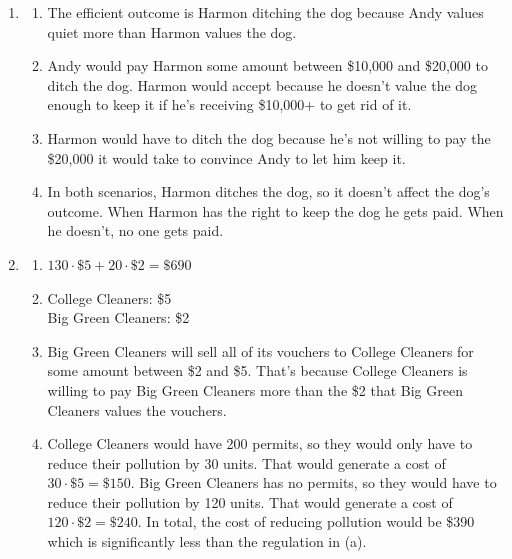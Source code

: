\documentclass{article}
\begin{document}
\begin{enumerate}
\begin{enumerate}
	\item The government could place a \$2 per unit subsidy on solar cells.
	
	\end{enumerate}
	
\item

	\begin{enumerate}
	
	\item The efficient outcome is Harmon ditching the dog because Andy values quiet more than Harmon values the dog.
	
	\item Andy would pay Harmon some amount between \$10,000 and \$20,000 to ditch the dog. Harmon would accept because he doesn't value the dog enough to keep it if he's receiving \$10,000+ to get rid of it. 
	
	\item Harmon would have to ditch the dog because he's not willing to pay the \$20,000 it would take to convince Andy to let him keep it.
	
	\item In both scenarios, Harmon ditches the dog, so it doesn't affect the dog's outcome. When Harmon has the right to keep the dog he gets paid. When he doesn't, no one gets paid.
	
	\end{enumerate}
	
\item

	\begin{enumerate}
	
	\item $130 \cdot \$5 + 20 \cdot \$2 = \$690$
	
	\item College Cleaners: \$5 \\
		Big Green Cleaners: \$2
		
	\item Big Green Cleaners will sell all of its vouchers to College Cleaners for some amount between \$2 and \$5. That's because College Cleaners is willing to pay Big Green Cleaners more than the \$2 that Big Green Cleaners values the vouchers.
	
	\item College Cleaners would have 200 permits, so they would only have to reduce their pollution by 30 units. That would generate a cost of $30 \cdot \$5 = \$150$. Big Green Cleaners has no permits, so they would have to reduce their pollution by 120 units. That would generate a cost of $120 \cdot \$2 = \$240$. In total, the cost of reducing pollution would be \$390 which is significantly less than the regulation in (a).
	
	\end{enumerate}

\end{enumerate}
\end{document}
